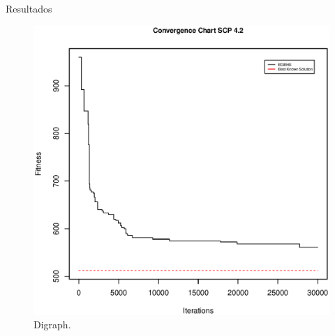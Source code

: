 Resultados

\begin{figure}[!htb]
\centering
\includegraphics[scale=.65]{Resultados/scp42.eps}
\caption{Digraph.}
\label{fig:digraph}
\end{figure}